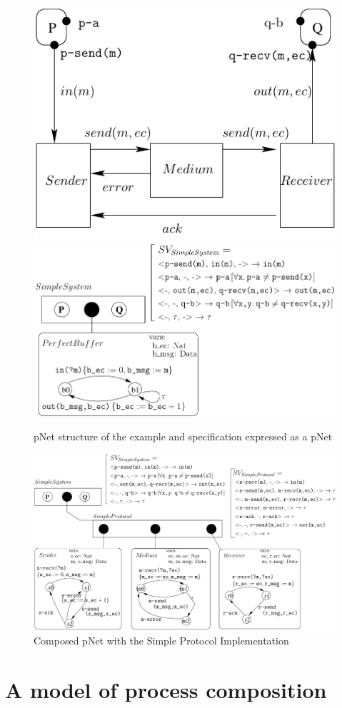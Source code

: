 \documentclass{lmcs}
\begin{document}
\begin{figure}[t]
   \includegraphics[width=.37\textwidth]{XFIG/SimpleProt-Schema.pdf}
   \includegraphics[width=.62\textwidth]{XFIG/SimpleProt2-Spec.pdf}
   \caption{pNet structure of the example and specification expressed as a pNet}
   \label{SimpleProt:Spec}

\end{figure}

  
\begin{figure}[t]
  \centerline{\includegraphics[width=.95\textwidth]{XFIG/SimpleProt2-pNet-tau}}
  \caption{Composed pNet with the Simple Protocol Implementation}  \label{SimpleProt:Impl}
\end{figure}

\section{A model of process composition}\label{sec:OT}
\end{document}
